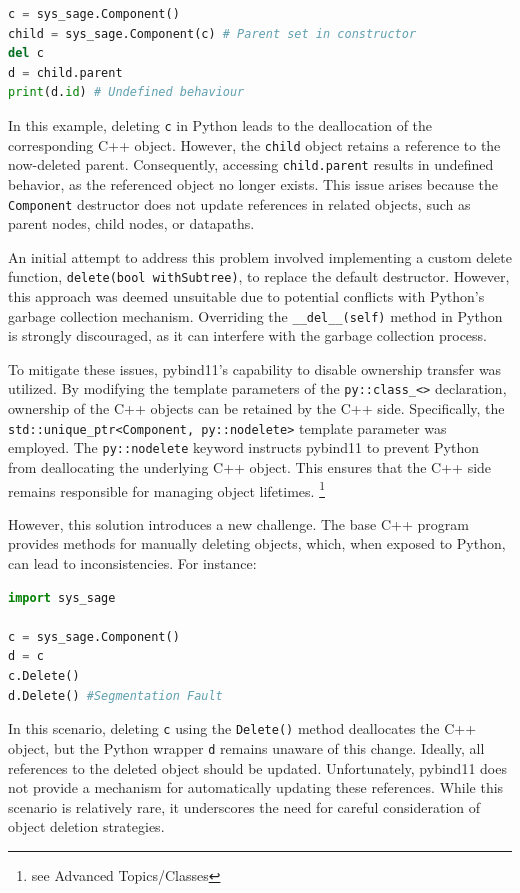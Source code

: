   \begin{lstlisting}[language=Python, xleftmargin=4em, frame = single]
c = sys_sage.Component()
child = sys_sage.Component(c) # Parent set in constructor
del c
d = child.parent
print(d.id) # Undefined behaviour
  \end{lstlisting}

In this example, deleting \verb|c| in Python leads to the deallocation of the corresponding C++ object. However, the \verb|child| object retains a reference to the now-deleted parent. Consequently, accessing \verb|child.parent| results in undefined behavior, as the referenced object no longer exists. This issue arises because the \verb|Component| destructor does not update references in related objects, such as parent nodes, child nodes, or datapaths.

An initial attempt to address this problem involved implementing a custom delete function, \verb|delete(bool withSubtree)|, to replace the default destructor. However, this approach was deemed unsuitable due to potential conflicts with Python's garbage collection mechanism. Overriding the \verb|__del__(self)| method in Python is strongly discouraged, as it can interfere with the garbage collection process. \cite{python-gc}\cite{pybind11-issue-327}

To mitigate these issues, pybind11's capability to disable ownership transfer was utilized. By modifying the template parameters of the \verb|py::class_<>| declaration, ownership of the C++ objects can be retained by the C++ side. Specifically, the \verb|std::unique_ptr<Component, py::nodelete>| template parameter was employed. The \verb|py::nodelete| keyword instructs pybind11 to prevent Python from deallocating the underlying C++ object. This ensures that the C++ side remains responsible for managing object lifetimes. \cite{pybind11-docu}\footnote{see Advanced Topics/Classes}

However, this solution introduces a new challenge. The base C++ program provides methods for manually deleting objects, which, when exposed to Python, can lead to inconsistencies. For instance:
\newpage
  \begin{lstlisting}[language=Python, xleftmargin=4em, frame = single]
import sys_sage

c = sys_sage.Component()
d = c
c.Delete()
d.Delete() #Segmentation Fault
  \end{lstlisting}
  

In this scenario, deleting \verb|c| using the \verb|Delete()| method deallocates the C++ object, but the Python wrapper \verb|d| remains unaware of this change. Ideally, all references to the deleted object should be updated. Unfortunately, pybind11 does not provide a mechanism for automatically updating these references. While this scenario is relatively rare, it underscores the need for careful consideration of object deletion strategies.

